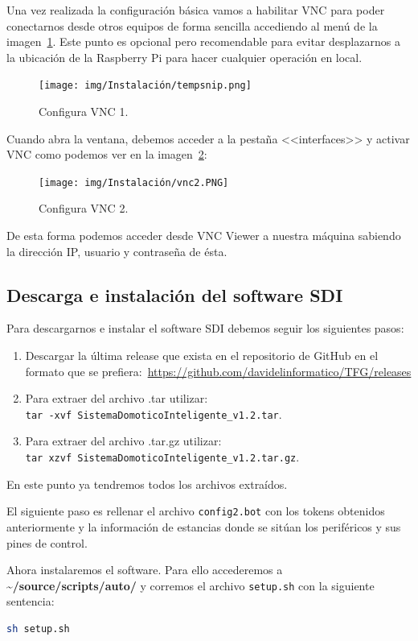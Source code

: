 Una vez realizada la configuración básica vamos a habilitar VNC para poder conectarnos desde otros equipos de forma sencilla accediendo al menú de la imagen~\ref{VNC1}. Este punto es opcional pero recomendable para evitar desplazarnos a la ubicación de la Raspberry Pi para hacer cualquier operación en local.

\begin{figure}[h]
\centering
\texttt{[image: img/Instalación/tempsnip.png]}
\caption{Configura VNC 1.}\label{VNC1}
\end{figure}

Cuando abra la ventana, debemos acceder a la pestaña <<interfaces>> y activar VNC como podemos ver en la imagen~\ref{VNC2}:

\begin{figure}[h]
\centering
\texttt{[image: img/Instalación/vnc2.PNG]}
\caption{Configura VNC 2.}\label{VNC2}
\end{figure}

De esta forma podemos acceder desde VNC Viewer a nuestra máquina sabiendo la dirección IP, usuario y contraseña de ésta.

\subsection{Descarga e instalación del software SDI}
Para descargarnos e instalar el software SDI debemos seguir los siguientes pasos:

\begin{enumerate}
    \item Descargar la última release que exista en el repositorio de GitHub en el formato que se prefiera:~\url{https://github.com/davidelinformatico/TFG/releases}
    \item Para extraer del archivo .tar utilizar:~\\ \texttt{tar -xvf SistemaDomoticoInteligente\_v1.2.tar}.
    \item Para extraer del archivo .tar.gz utilizar:~\\ \texttt{tar xzvf SistemaDomoticoInteligente\_v1.2.tar.gz}.
\end{enumerate}
En este punto ya tendremos todos los archivos extraídos.

El siguiente paso es rellenar el archivo \texttt{config2.bot} con los tokens obtenidos anteriormente y la información de estancias donde se sitúan los periféricos y sus pines de control.

Ahora instalaremos el software. Para ello accederemos a \textbf{\textasciitilde/source/scripts/auto/} y corremos el archivo \texttt{setup.sh} con la siguiente sentencia:
\begin{lstlisting}[language=sh,firstnumber=0]
sh setup.sh
\end{lstlisting}

